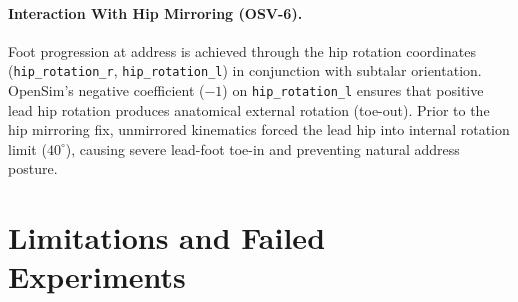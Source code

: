 \documentclass[11pt]{article}
\begin{document}
\paragraph{Interaction With Hip Mirroring (OSV-6).}
Foot progression at address is achieved through the hip rotation coordinates (\texttt{hip\_rotation\_r}, \texttt{hip\_rotation\_l}) in conjunction with subtalar orientation. OpenSim's negative coefficient ($-1$) on \texttt{hip\_rotation\_l} ensures that positive lead hip rotation produces anatomical external rotation (toe-out). Prior to the hip mirroring fix, unmirrored kinematics forced the lead hip into internal rotation limit ($40^\circ$), causing severe lead-foot toe-in and preventing natural address posture.

\section{Limitations and Failed Experiments}
\end{document}
